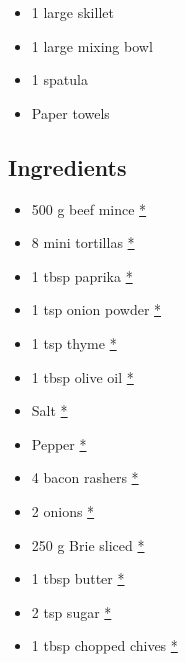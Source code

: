 \documentclass[
]{book}
\providecommand{\tightlist}{%
  \setlength{\itemsep}{0pt}\setlength{\parskip}{0pt}}
\begin{document}
\begin{itemize}
\tightlist
\item
  1 large skillet
\item
  1 large mixing bowl
\item
  1 spatula
\item
  Paper towels
\end{itemize}

\subsection*{Ingredients}\label{ingredients-5}

\begin{itemize}
\tightlist
\item
  500 g beef mince
  \href{https://www.publix.com/pd/lean-ground-beef-burgers-7-fat-publix-beef-usda-inspected/RIO-PCI-117504?origin=search13}{*}
\item
  8 mini tortillas
  \href{https://www.publix.com/pd/mission-flour-tortillas-street-tacos/RIO-PCI-563292?origin=search12}{*}
\item
  1 tbsp paprika
  \href{https://www.publix.com/pd/publix-paprika-ground/RIO-PCI-123196?origin=search1}{*}
\item
  1 tsp onion powder
  \href{https://www.publix.com/pd/publix-onion-powder/RIO-PCI-111136?origin=search1}{*}
\item
  1 tsp thyme
  \href{https://www.publix.com/pd/thats-tasty-thyme/RIO-PCI-574066?origin=search2}{*}
\item
  1 tbsp olive oil
  \href{https://www.publix.com/pd/publix-olive-oil-extra-virgin/RIO-PCI-103897?origin=search1}{*}
\item
  Salt
  \href{https://www.publix.com/pd/morton-salt/RIO-PCI-103677?origin=search9}{*}
\item
  Pepper
  \href{https://www.publix.com/pd/publix-black-pepper-ground/RIO-PCI-110488?origin=search1}{*}
\item
  4 bacon rashers
  \href{https://www.publix.com/pd/hormel-black-label-bacon-original/RIO-PCI-117322?origin=search3}{*}
\item
  2 onions
  \href{https://www.publix.com/pd/white-onions-jumbo/RIO-PCI-107142?origin=search3}{*}
\item
  250 g Brie sliced
  \href{https://www.publix.com/pd/publix-deli-brie-cheese-imported-round/RIO-PCI-174121?origin=search5}{*}
\item
  1 tbsp butter
  \href{https://www.publix.com/pd/land-o-lakes-salted-butter-sticks/RIO-PCI-112640?origin=search2}{*}
\item
  2 tsp sugar
  \href{https://www.publix.com/pd/publix-sugar-pure-granulated-extra-fine/RIO-PCI-143101?origin=search1}{*}
\item
  1 tbsp chopped chives
  \href{https://www.publix.com/pd/thats-tasty-chives/RIO-PCI-574073?origin=search2}{*}
\end{itemize}
\end{document}
